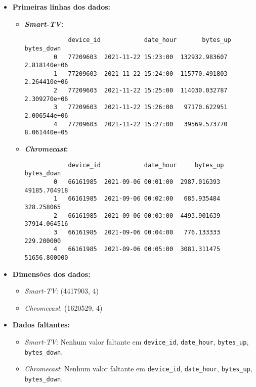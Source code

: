 \begin{itemize}
    \item \textbf{Primeiras linhas dos dados:}
    \begin{itemize}
        \item \textbf{\textit{Smart-TV}:}
        \begin{verbatim}
            device_id            date_hour       bytes_up    bytes_down
        0   77209603  2021-11-22 15:23:00  132932.983607  2.818140e+06
        1   77209603  2021-11-22 15:24:00  115770.491803  2.264410e+06
        2   77209603  2021-11-22 15:25:00  114030.032787  2.309270e+06
        3   77209603  2021-11-22 15:26:00   97170.622951  2.006544e+06
        4   77209603  2021-11-22 15:27:00   39569.573770  8.061440e+05
        \end{verbatim}
        
        \item \textbf{\textit{Chromecast}:}
        \begin{verbatim}
            device_id            date_hour     bytes_up    bytes_down
        0   66161985  2021-09-06 00:01:00  2987.016393  49185.704918
        1   66161985  2021-09-06 00:02:00   685.935484    328.258065
        2   66161985  2021-09-06 00:03:00  4493.901639  37914.064516
        3   66161985  2021-09-06 00:04:00   776.133333    229.200000
        4   66161985  2021-09-06 00:05:00  3081.311475  51656.800000
        \end{verbatim}
    \end{itemize}
    
    \item \textbf{Dimensões dos dados:}
    \begin{itemize}
        \item \textit{Smart-TV}: (4417903, 4)
        \item \textit{Chromecast}: (1620529, 4)
    \end{itemize}

    \item \textbf{Dados faltantes:}
    \begin{itemize}
        \item \textit{Smart-TV}: Nenhum valor faltante em \texttt{device\_id}, \texttt{date\_hour}, \texttt{bytes\_up}, \texttt{bytes\_down}.
        \item \textit{Chromecast}: Nenhum valor faltante em \texttt{device\_id}, \texttt{date\_hour}, \texttt{bytes\_up}, \texttt{bytes\_down}.
    \end{itemize}


\end{itemize}
